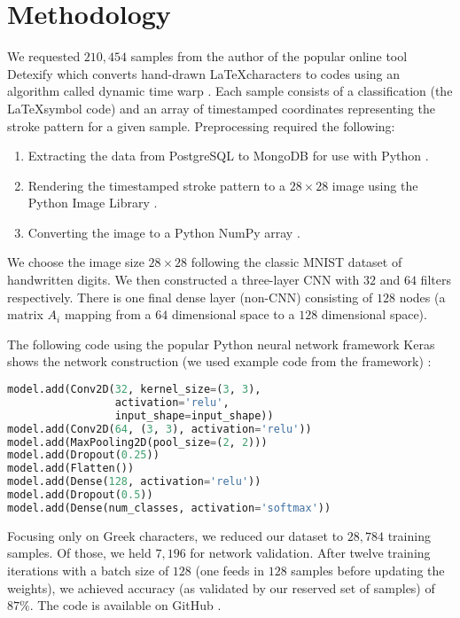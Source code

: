 \documentclass[12pt,letterpaper,boxed]{article}
\begin{document}
\section{Methodology}
		We requested $210,454$ samples from the author of the popular online tool Detexify \cite{detexify} which converts hand-drawn \LaTeX characters to codes using an algorithm called dynamic time warp \cite{donald1994}. Each sample consists of a classification (the \LaTeX symbol code) and an array of timestamped coordinates representing the stroke pattern for a given sample. Preprocessing required the following:
		\begin{enumerate}
			\item Extracting the data from PostgreSQL to MongoDB for use with Python \cite{mongodb}.
			\item Rendering the timestamped stroke pattern to a $28\times28$ image using the Python Image Library \cite{pil}.
			\item Converting the image to a Python NumPy array \cite{numpy}.
		\end{enumerate}
		
		We choose the image size $28\times28$ following the classic MNIST \cite{mnist} dataset of handwritten digits. We then constructed a three-layer CNN with $32$ and $64$ filters respectively. There is one final dense layer (non-CNN) consisting of $128$ nodes (a matrix $A_i$ mapping from a $64$ dimensional space to a $128$ dimensional space).
		
		The following code using the popular Python neural network framework Keras \cite{keras} shows the network construction (we used example code from the framework) \cite{kerasMnist}:
		
		\begin{lstlisting}[language=Python]
model.add(Conv2D(32, kernel_size=(3, 3),
                 activation='relu',
                 input_shape=input_shape))
model.add(Conv2D(64, (3, 3), activation='relu'))
model.add(MaxPooling2D(pool_size=(2, 2)))
model.add(Dropout(0.25))
model.add(Flatten())
model.add(Dense(128, activation='relu'))
model.add(Dropout(0.5))
model.add(Dense(num_classes, activation='softmax'))
		\end{lstlisting}

		Focusing only on Greek characters, we reduced our dataset to  $28,784$ training samples. Of those, we held $7,196$ for network validation. After twelve training iterations with a batch size of $128$ (one feeds in $128$ samples before updating the weights), we achieved accuracy (as validated by our reserved set of samples) of $87\%$. The code is available on GitHub \cite{mycodebase}.
\end{document}
